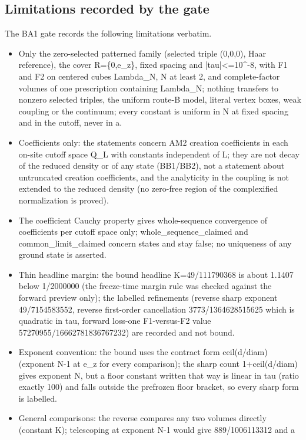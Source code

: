 \subsection{Limitations recorded by the gate}
\label{sec:ba1-limits}
The BA1 gate records the following limitations verbatim.
\begin{gatequote}
\begin{itemize}
\item Only the zero-selected patterned family (selected triple (0,0,0), Haar
reference), the cover R=\{0,e\_z\}, fixed spacing and
|tau|<=10\textasciicircum{}-8, with F1 and F2 on centered cubes Lambda\_N, N
at least 2, and complete-factor volumes of one prescription containing
Lambda\_N; nothing transfers to nonzero selected triples, the uniform route-B
model, literal vertex boxes, weak coupling or the continuum; every constant is
uniform in N at fixed spacing and in the cutoff, never in a.
\item Coefficients only: the statements concern AM2 creation coefficients in
each on-site cutoff space Q\_L with constants independent of L; they are not
decay of the reduced density or of any state (BB1/BB2), not a statement about
untruncated creation coefficients, and the analyticity in the coupling is not
extended to the reduced density (no zero-free region of the complexified
normalization is proved).
\item The coefficient Cauchy property gives whole-sequence convergence of
coefficients per cutoff space only; whole\_sequence\_claimed and
common\_limit\_claimed concern states and stay false; no uniqueness of any
ground state is asserted.
\item Thin headline margin: the bound headline K=49/111790368 is about 1.1407
below 1/2000000 (the freeze-time margin rule was checked against the forward
preview only); the labelled refinements (reverse sharp exponent 49/7154583552,
reverse first-order cancellation 3773/1364628515625 which is quadratic in tau,
forward loss-one F1-versus-F2 value 57270955/16662781836767232) are recorded
and not bound.
\item Exponent convention: the bound uses the contract form ceil(d/diam)
(exponent N-1 at e\_z for every comparison); the sharp count 1+ceil(d/diam)
gives exponent N, but a floor constant written that way is linear in tau
(ratio exactly 100) and falls outside the prefrozen floor bracket, so every
sharp form is labelled.
\item General comparisons: the reverse compares any two volumes directly
(constant K); telescoping at exponent N-1 would give 889/1006113312 and a

\end{itemize}
\end{gatequote}
